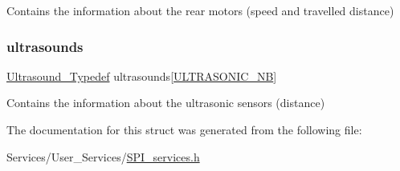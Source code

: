 Contains the information about the rear motors (speed and travelled distance) \mbox{\label{struct_communication___typedef_a30835d9cdfc16faa82377c90fe401538}} 
\subsubsection{\texorpdfstring{ultrasounds}{ultrasounds}}
{\footnotesize\ttfamily \hyperlink{struct_ultrasound___typedef}{Ultrasound\+\_\+\+Typedef} ultrasounds\mbox{[}\hyperlink{sensors__common_8h_a26f5abbcd6c4905330b730b809794176}{U\+L\+T\+R\+A\+S\+O\+N\+I\+C\+\_\+\+NB}\mbox{]}}

Contains the information about the ultrasonic sensors (distance) 

The documentation for this struct was generated from the following file\+:\begin{DoxyCompactItemize}
\item 
Services/\+User\+\_\+\+Services/\hyperlink{_s_p_i__services_8h}{S\+P\+I\+\_\+services.\+h}\end{DoxyCompactItemize}
